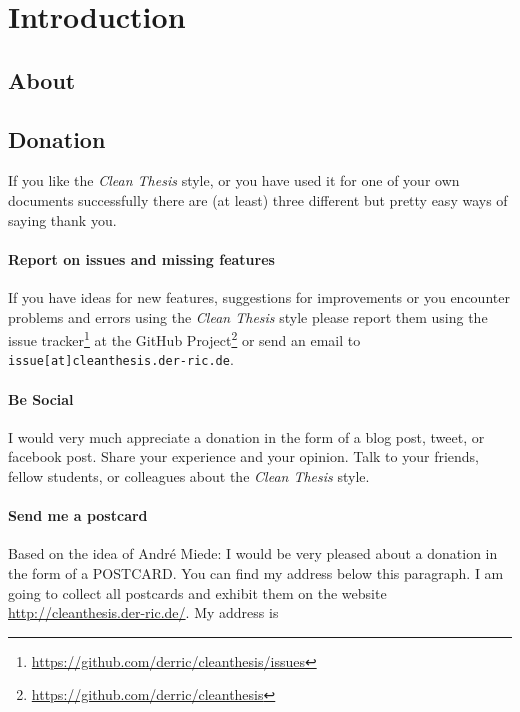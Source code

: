 \documentclass{ltxdockit}
\newcommand*{\cleanthesis}{\emph{Clean Thesis}\xspace}
\newcommand*{\cthesishome}{http://cleanthesis.der-ric.de/}
\begin{document}
\printtitlepage
\tableofcontents

\section{Introduction}
\label{sec:intro}

\subsection[About]{About }
\label{sec:intro:about}

\subsection{Donation}
\label{sec:intro:donation}

If you like the \cleanthesis style, or you have used it for one of your own documents successfully there are (at least) three different but pretty easy ways of saying thank you.

\paragraph{Report on issues and missing features} If you have ideas for new features, suggestions for improvements or you encounter problems and errors using the \cleanthesis style please report them using the issue tracker\footnote{\url{https://github.com/derric/cleanthesis/issues}} at the GitHub Project\footnote{\url{https://github.com/derric/cleanthesis}} or send an email to \texttt{issue[at]cleanthesis.der-ric.de}.

\paragraph{Be Social} I would very much appreciate a donation in the form of a blog post, tweet, or facebook post. Share your experience and your opinion. Talk to your friends, fellow students, or colleagues about the \cleanthesis style.

\paragraph{Send me a postcard} Based on the idea of André Miede: I would be very pleased about a donation in the form of a POSTCARD. You can find my address below this paragraph. I am going to collect all postcards and exhibit them on the website \url{\cthesishome}. My address is
\end{document}
